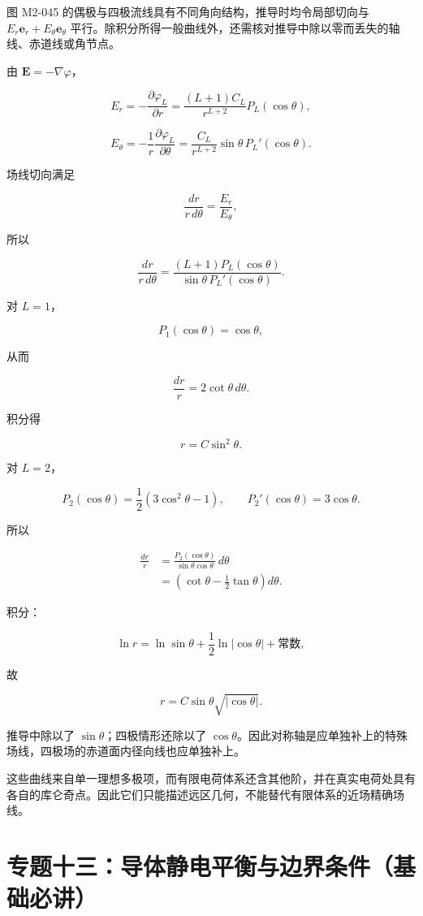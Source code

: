 图 M2-045 的偶极与四极流线具有不同角向结构，推导时均令局部切向与
\(E_r\mathbf e_r+E_{\theta}\mathbf e_{\theta}\)
平行。除积分所得一般曲线外，还需核对推导中除以零而丢失的轴线、赤道线或角节点。

由 \(\mathbf E=-\nabla\varphi\)，

\[
E_r
=-\frac{\partial\varphi_L}{\partial r}
=\frac{(L+1)C_L}{r^{L+2}}P_L(\cos\theta),
\]

\[
E_{\theta}
=-\frac1r\frac{\partial\varphi_L}{\partial\theta}
=\frac{C_L}{r^{L+2}}
\sin\theta\,P_L'(\cos\theta).
\]

场线切向满足

\[
\frac{dr}{r\,d\theta}
=\frac{E_r}{E_{\theta}},
\]

所以

\[
\boxed{
\frac{dr}{r\,d\theta}
=\frac{(L+1)P_L(\cos\theta)}
{\sin\theta\,P_L'(\cos\theta)}
}.
\]

对 \(L=1\)，

\[
P_1(\cos\theta)=\cos\theta,
\]

从而

\[
\frac{dr}{r}=2\cot\theta\,d\theta.
\]

积分得

\[
\boxed{r=C\sin^2\theta}.
\]

对 \(L=2\)，

\[
P_2(\cos\theta)=\frac12(3\cos^2\theta-1),
\qquad
P_2'(\cos\theta)=3\cos\theta.
\]

所以

\[
\begin{aligned}
\frac{dr}{r}
&=\frac{P_2(\cos\theta)}{\sin\theta\cos\theta}
\,d\theta\\
&=\left(\cot\theta-\frac12\tan\theta\right)d\theta.
\end{aligned}
\]

积分：

\[
\ln r
=\ln\sin\theta
+\frac12\ln|\cos\theta|
+\text{常数},
\]

故

\[
\boxed{
r=C\sin\theta\sqrt{|\cos\theta|}
}.
\]

推导中除以了 \(\sin\theta\)；四极情形还除以了
\(\cos\theta\)。因此对称轴是应单独补上的特殊场线，四极场的赤道面内径向线也应单独补上。

这些曲线来自单一理想多极项，而有限电荷体系还含其他阶，并在真实电荷处具有各自的库仑奇点。因此它们只能描述远区几何，不能替代有限体系的近场精确场线。

\section{专题十三：导体静电平衡与边界条件（基础必讲）}\label{m2:ux4e13ux9898ux5341ux4e09ux5bfcux4f53ux9759ux7535ux5e73ux8861ux4e0eux8fb9ux754cux6761ux4ef6ux57faux7840ux5fc5ux8bb2}

